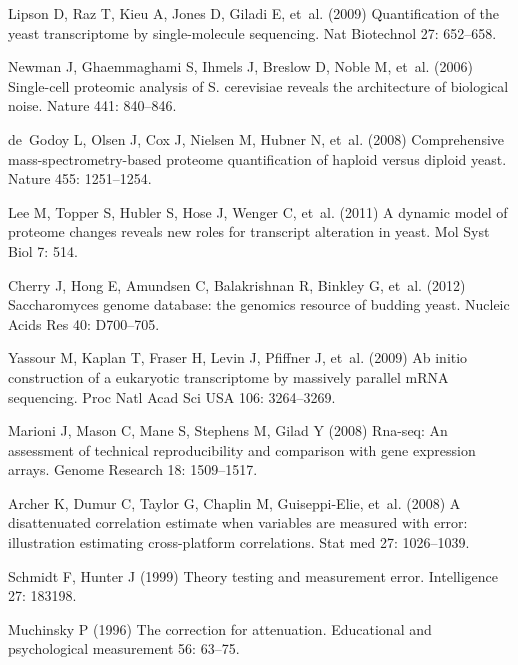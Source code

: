\documentclass[10pt]{article}
\begin{document}
\begin{thebibliography}{10}
Lipson D, Raz T, Kieu A, Jones D, Giladi E, et~al. (2009) Quantification of the
  yeast transcriptome by single-molecule sequencing.
\newblock Nat Biotechnol 27: 652--658.

Newman J, Ghaemmaghami S, Ihmels J, Breslow D, Noble M, et~al. (2006)
  Single-cell proteomic analysis of {S.} cerevisiae reveals the architecture of
  biological noise.
\newblock Nature 441: 840--846.

de~Godoy L, Olsen J, Cox J, Nielsen M, Hubner N, et~al. (2008) Comprehensive
  mass-spectrometry-based proteome quantification of haploid versus diploid
  yeast.
\newblock Nature 455: 1251--1254.

Lee M, Topper S, Hubler S, Hose J, Wenger C, et~al. (2011) A dynamic model of
  proteome changes reveals new roles for transcript alteration in yeast.
\newblock Mol Syst Biol 7: 514.

Cherry J, Hong E, Amundsen C, Balakrishnan R, Binkley G, et~al. (2012)
  Saccharomyces genome database: the genomics resource of budding yeast.
\newblock Nucleic Acids Res 40: D700--705.

Yassour M, Kaplan T, Fraser H, Levin J, Pfiffner J, et~al. (2009) Ab initio
  construction of a eukaryotic transcriptome by massively parallel {mRNA}
  sequencing.
\newblock Proc Natl Acad Sci USA 106: 3264--3269.

Marioni J, Mason C, Mane S, Stephens M, Gilad Y (2008) Rna-seq: An assessment
  of technical reproducibility and comparison with gene expression arrays.
\newblock Genome Research 18: 1509--1517.

Archer K, Dumur C, Taylor G, Chaplin M, Guiseppi-Elie, et~al. (2008) A
  disattenuated correlation estimate when variables are measured with error:
  illustration estimating cross-platform correlations.
\newblock Stat med 27: 1026--1039.

Schmidt F, Hunter J (1999) Theory testing and measurement error.
\newblock Intelligence 27: 183198.

Muchinsky P (1996) The correction for attenuation.
\newblock Educational and psychological measurement 56: 63--75.


\end{thebibliography}
\end{document}
